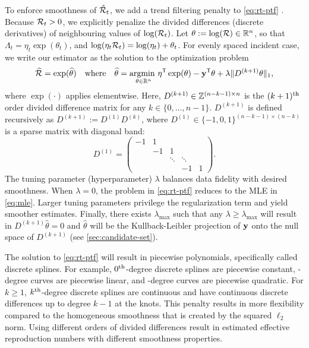 To enforce smoothness of $\hat{\mathcal{R}}_t$, we add a trend filtering penalty to
\eqref{eq:rt-ptf} \citep{kim2009ell_1, tibshirani2014adaptive, tibshirani2022divided, 
sadhanala2022exponential}. Because $\mathcal{R}_t > 0$,
we explicitly penalize the divided differences (discrete derivatives) of
neighbouring values of $\log(\mathcal{R}_t)$. 
Let $\theta := \log(\mathcal{R}) \in \mathbb{R}^n$, so that $\Lambda_t =
\eta_t \exp(\theta_t)$, and $\log(\eta_t \mathcal{R}_t) = \log(\eta_t) +
\theta_t$. For evenly spaced incident case, we
write our estimator as the solution to the optimization problem
\begin{equation} 
  \label{eq:rt-ptf}
  \widehat{\mathcal{R}} = \exp(\widehat{\theta}) \quad\textrm{where}\quad \widehat{\theta} 
  = \underset{\theta\in\mathbb{R}^n}{\operatorname*{argmin}\ } \eta^{\mathsf{T}} \exp(\theta) - \mathbf{y}^{\mathsf{T}} \theta + \lambda 
  \lVert D^{(k+1)} \theta \rVert_1,
\end{equation}
where $\exp(\cdot)$ applies elementwise.
Here, $D^{(k+1)} \in \mathbb{Z}^{(n-k-1)\times n}$ is the $(k+1)^{\textnormal{th}}$ order divided
difference matrix for any $k \in \{0,\ldots,n-1\}$. $D^{(k+1)}$ is defined 
recursively as $D^{(k+1)} := D^{(1)} D^{(k)}$, where 
$D^{(1)} \in \{-1,0,1\}^{(n-k-1)\times (n-k)}$ is a sparse matrix with diagonal band: 
$$D^{(1)} = \begin{pmatrix} 
  -1 & 1 &  & & \\ 
  & -1 & 1 & & \\ 
  & & \ddots & \ddots & \\
  & & & -1 & 1 
\end{pmatrix}.$$ 
The tuning parameter (hyperparameter) $\lambda$ balances data
fidelity with desired smoothness. When $\lambda=0$, the problem in
\eqref{eq:rt-ptf} reduces to the MLE in \eqref{eq:mle}. Larger tuning parameters
privilege the regularization term and yield smoother estimates. Finally, there
exists $\lambda_{\textrm{max}}$ such that any $\lambda \geq
\lambda_{\textrm{max}}$ will result in $D^{(k+1)} \widehat {\theta} = 0$ and
$\widehat{\theta}$ will be the Kullback-Leibler projection of $\mathbf{y}$ onto the
null space of $D^{(k+1)}$ (see \autoref{sec:candidate-set}).

The solution to \eqref{eq:rt-ptf} will result in piecewise 
polynomials, specifically called discrete splines. For example, $0^{\textnormal{th}}$-degree
discrete splines are piecewise constant, \first-degree curves are piecewise
linear, and \second-degree curves are piecewise quadratic. For $k\geq 1$,
$k^{\textnormal{th}}$-degree discrete splines are continuous and have continuous discrete
differences up to degree $k-1$ at the knots. This penalty results in more
flexibility compared to the homogeneous smoothness that is created by the
squared $\ell_2$ norm. Using different orders of divided differences result in
estimated effective reproduction numbers with different smoothness properties. 



